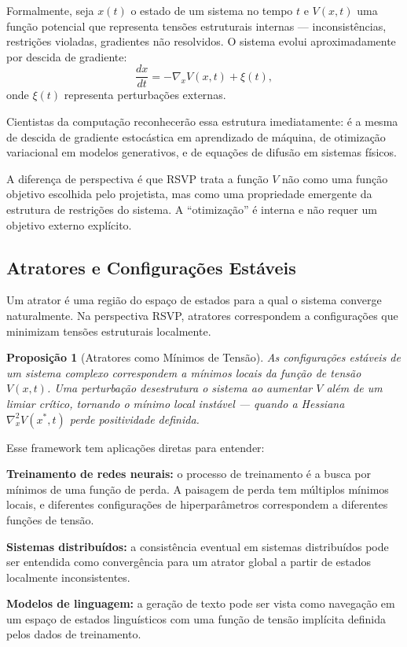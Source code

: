 \documentclass[11pt, a4paper]{article}
\theoremstyle{named}
\newtheorem{proposicao}{Proposição}
\begin{document}
Formalmente, seja $x(t)$ o estado de um sistema no tempo $t$ e
$V(x, t)$ uma função potencial que representa tensões estruturais
internas — inconsistências, restrições violadas, gradientes não
resolvidos. O sistema evolui aproximadamente por descida de gradiente:
\[
  \frac{dx}{dt} = -\nabla_x V(x,t) + \xi(t),
\]
onde $\xi(t)$ representa perturbações externas.

Cientistas da computação reconhecerão essa estrutura imediatamente:
é a mesma de descida de gradiente estocástica em aprendizado de máquina,
de otimização variacional em modelos generativos, e de equações de
difusão em sistemas físicos.

A diferença de perspectiva é que RSVP trata a função $V$ não como
uma função objetivo escolhida pelo projetista, mas como uma propriedade
emergente da estrutura de restrições do sistema. A ``otimização'' é
interna e não requer um objetivo externo explícito.

\subsection{Atratores e Configurações Estáveis}

Um atrator é uma região do espaço de estados para a qual o sistema
converge naturalmente. Na perspectiva RSVP, atratores correspondem a
configurações que minimizam tensões estruturais localmente.

\begin{proposicao}[Atratores como Mínimos de Tensão]
As configurações estáveis de um sistema complexo correspondem a mínimos
locais da função de tensão $V(x,t)$. Uma perturbação desestrutura o
sistema ao aumentar $V$ além de um limiar crítico, tornando o mínimo
local instável — quando a Hessiana $\nabla_x^2 V(x^*,t)$ perde
positividade definida.
\end{proposicao}

Esse framework tem aplicações diretas para entender:

\textbf{Treinamento de redes neurais:} o processo de treinamento é a
busca por mínimos de uma função de perda. A paisagem de perda tem
múltiplos mínimos locais, e diferentes configurações de hiperparâmetros
correspondem a diferentes funções de tensão.

\textbf{Sistemas distribuídos:} a consistência eventual em sistemas
distribuídos pode ser entendida como convergência para um atrator
global a partir de estados localmente inconsistentes.

\textbf{Modelos de linguagem:} a geração de texto pode ser vista como
navegação em um espaço de estados linguísticos com uma função de tensão
implícita definida pelos dados de treinamento.
\end{document}
